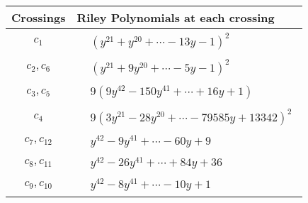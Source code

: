 \documentclass[1p]{elsarticle_modified}
\theoremstyle{definition}
\begin{document}
\begin{tabular}{m{50pt}|m{274pt}}
Crossings & \hspace{64pt}Riley Polynomials at each crossing \\
\hline $$\begin{aligned}c_{1}\end{aligned}$$&$\begin{aligned}
&(y^{21}+y^{20}+\cdots-13 y-1)^{2}
\end{aligned}$\\
\hline $$\begin{aligned}c_{2},c_{6}\end{aligned}$$&$\begin{aligned}
&(y^{21}+9 y^{20}+\cdots-5 y-1)^{2}
\end{aligned}$\\
\hline $$\begin{aligned}c_{3},c_{5}\end{aligned}$$&$\begin{aligned}
&9(9 y^{42}-150 y^{41}+\cdots+16 y+1)
\end{aligned}$\\
\hline $$\begin{aligned}c_{4}\end{aligned}$$&$\begin{aligned}
&9(3 y^{21}-28 y^{20}+\cdots-79585 y+13342)^{2}
\end{aligned}$\\
\hline $$\begin{aligned}c_{7},c_{12}\end{aligned}$$&$\begin{aligned}
&y^{42}-9 y^{41}+\cdots-60 y+9
\end{aligned}$\\
\hline $$\begin{aligned}c_{8},c_{11}\end{aligned}$$&$\begin{aligned}
&y^{42}-26 y^{41}+\cdots+84 y+36
\end{aligned}$\\
\hline $$\begin{aligned}c_{9},c_{10}\end{aligned}$$&$\begin{aligned}
&y^{42}-8 y^{41}+\cdots-10 y+1
\end{aligned}$\\
\hline
\end{tabular}\\~\\
\end{document}
